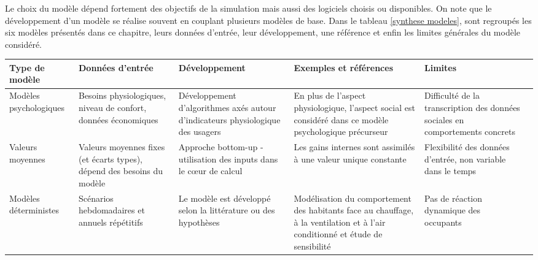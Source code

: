 
Le choix du modèle dépend fortement des objectifs de la simulation mais aussi des logiciels choisis ou disponibles. On note que le développement d'un modèle se réalise souvent en couplant plusieurs modèles de base. Dans le tableau \ref{synthese modeles}, sont regroupés les six modèles présentés dans ce chapitre, leurs données d'entrée, leur développement, une référence et enfin les limites générales du modèle considéré. 

\begin{landscape}
\begin{table}
\centering
\begin{tabular}{|p{4.5cm}||p{4.5cm}|p{4.5cm}|p{4.5cm}|p{4.5cm}|p{4.5cm}|}
\hline Type de modèle & Données d'entrée & Développement & Exemples et références & Limites \\
\hline
\hline Modèles psychologiques & Besoins physiologiques, \newline niveau de confort, \newline données économiques & Développement d'algorithmes axés autour d'indicateurs physiologique des usagers & \cite{VanRaaij-83} En plus de l'aspect physiologique, l'aspect social est considéré dans ce modèle psychologique précurseur & Difficulté de la transcription des données sociales en comportements concrets  \\
\hline Valeurs moyennes & Valeurs moyennes fixes (et écarts types), \newline dépend des besoins du modèle & Approche bottom-up - \newline utilisation des inputs dans le cœur de calcul & \cite{Morel-09} Les gains internes sont assimilés à une valeur unique constante & Flexibilité des données d'entrée, \newline non variable dans le temps \\
\hline Modèles déterministes & Scénarios hebdomadaires et annuels répétitifs & Le modèle est développé selon la littérature ou des hypothèses & \cite{Glicksman-97} Modélisation du comportement des habitants face au chauffage, à la ventilation et à l'air conditionné et étude de sensibilité & Pas de réaction dynamique des occupants \\

\end{tabular}
\end{table}
\end{landscape}
